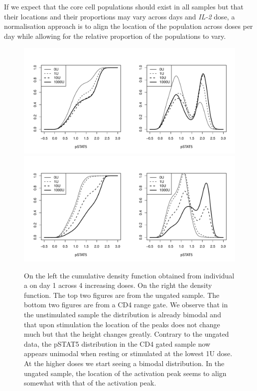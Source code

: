 If we expect that the core cell populations should exist in all samples but that their locations and their
proportions may vary across days and \emph{IL-2} dose, 
a normalisation approach is to align the location of the population across doses per day while allowing for the relative proportion of the populations to vary.

\begin{figure}[h]
    \centering
    \includegraphics[scale=.5]{IL2/figures/ungated-dose-effect.pdf}
    \includegraphics[scale=.5]{IL2/figures/lymph-dose-effect.pdf}
    \caption{  \label{figure:dose-effect}
        On the left the cumulative density function obtained from individual a on day 1 across 4 increasing doses.
        On the right the density function.
        The top two figures are from the ungated sample.
        The bottom two figures are from a CD4 range gate.
        We observe that in the unstimulated sample the distribution is already bimodal 
        and that upon stimulation the location of the peaks does not change much but that the height changes greatly.
        Contrary to the ungated data, the pSTAT5 distribution in the CD4 gated sample now appears unimodal when resting or stimulated
        at the lowest 1U dose.  At the higher doses we start seeing a bimodal distribution.
        In the ungated sample, the location of the activation peak seems to align somewhat with that of the activation peak.  }
\end{figure}

